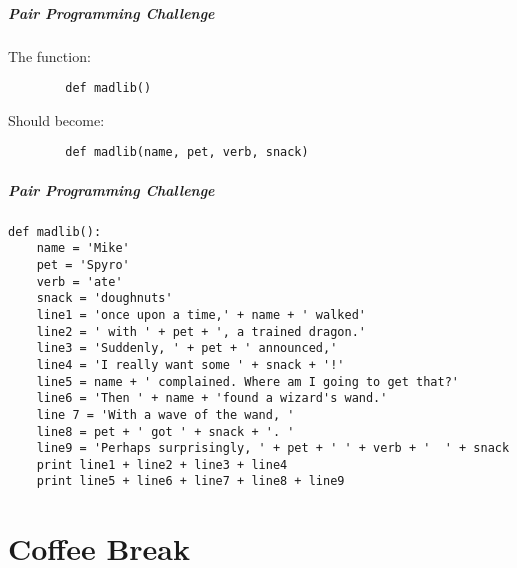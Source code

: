 \begin{frame}[fragile]
	\frametitle{Pair Programming Challenge}
	
	The function:

	\begin{lstlisting}
		def madlib()
	\end{lstlisting}
	
	\vspace{1.5em}
	
	Should become:
	
	\begin{lstlisting}
		def madlib(name, pet, verb, snack)
	\end{lstlisting}
	
\end{frame}


\begin{frame}[fragile]
	\frametitle{Pair Programming Challenge}
	
	\begin{lstlisting}
def madlib():
	name = 'Mike'
	pet = 'Spyro'
	verb = 'ate'
	snack = 'doughnuts'
	line1 = 'once upon a time,' + name + ' walked'
	line2 = ' with ' + pet + ', a trained dragon.'
	line3 = 'Suddenly, ' + pet + ' announced,'
	line4 = 'I really want some ' + snack + '!'
	line5 = name + ' complained. Where am I going to get that?'
	line6 = 'Then ' + name + 'found a wizard's wand.'
	line 7 = 'With a wave of the wand, '
	line8 = pet + ' got ' + snack + '. '
	line9 = 'Perhaps surprisingly, ' + pet + ' ' + verb + '  ' + snack
	print line1 + line2 + line3 + line4
	print line5 + line6 + line7 + line8 + line9

\end{lstlisting}
	
\end{frame}

\part{Coffee Break}

